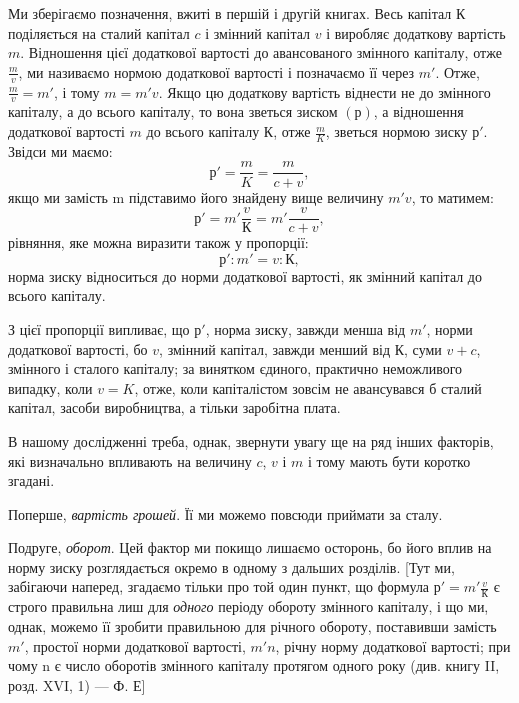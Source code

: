 
Ми зберігаємо позначення, вжиті в першій і другій книгах.
Весь капітал $К$ поділяється на сталий капітал $c$ і змінний капітал
$v$ і виробляє додаткову вартість $m$. Відношення цієї додаткової
вартості до авансованого змінного капіталу, отже $\frac{m}{v}$, ми
називаємо нормою додаткової вартості і позначаємо її через $m'$.
Отже, $\frac{m}{v} = m'$, і тому $m = m'v$. Якщо цю додаткову вартість
віднести не до змінного капіталу, а до всього капіталу, то вона
зветься зиском $(р)$, а відношення додаткової вартості $m$ до
всього капіталу $К$, отже $\frac{m}{K}$, зветься нормою зиску $р'$. Звідси ми
маємо:\[
р' = \frac{m}{K} = \frac{m}{c + v},
\]
якщо ми замість m підставимо його знайдену вище величину
$m'v$, то матимем:\[
р' = m'\frac{v}{К} = m'\frac{v}{c + v},
\]
рівняння, яке можна виразити також у пропорції:\[
р':m' = v:К,
\]
норма зиску відноситься до норми додаткової вартості, як змінний
капітал до всього капіталу.

З цієї пропорції випливає, що $р'$, норма зиску, завжди менша
від $m'$, норми додаткової вартості, бо $v$, змінний капітал, завжди
менший від $К$, суми $v + c$, змінного і сталого капіталу; за винятком
єдиного, практично неможливого випадку, коли $v = K$, отже,
коли капіталістом зовсім не авансувався б сталий капітал, засоби
виробництва, а тільки заробітна плата.

В нашому дослідженні треба, однак, звернути увагу ще на
ряд інших факторів, які визначально впливають на величину $c$,
$v$ і $m$ і тому мають бути коротко згадані.

Поперше, \emph{вартість грошей}. Її ми можемо повсюди приймати
за сталу.

Подруге, \emph{оборот}. Цей фактор ми покищо лишаємо осторонь,
бо його вплив на норму зиску розглядається окремо в одному
з дальших розділів. [Тут ми, забігаючи наперед, згадаємо тільки
про той один пункт, що формула $р' = m'\frac{v}{К}$ є строго правильна
лиш для \emph{одного} періоду обороту змінного капіталу, і що ми,
однак, можемо її зробити правильною для річного обороту, поставивши
замість $m'$, простої норми додаткової вартості, $m'n$,
річну норму додаткової вартості; при чому n є число оборотів
змінного капіталу протягом одного року (див. книгу II, розд.
XVI, 1) — Ф. Е]
